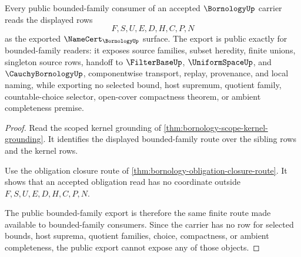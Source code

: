 \begin{theorem}
\label{thm:bornology-public-bounded-family-export}
Every public bounded-family consumer of an accepted $\BornologyUp$ carrier reads the displayed rows
$$
F,S,U,E,D,H,C,P,N
$$
as the exported $\NameCert_{\BornologyUp}$ surface. The export is public exactly for bounded-family readers: it exposes source families, subset heredity, finite unions, singleton source rows, handoff to $\FilterBaseUp$, $\UniformSpaceUp$, and $\CauchyBornologyUp$, componentwise transport, replay, provenance, and local naming, while exporting no selected bound, host supremum, quotient family, countable-choice selector, open-cover compactness theorem, or ambient completeness premise.
\end{theorem}
\begin{proof}
Read the scoped kernel grounding of \autoref{thm:bornology-scope-kernel-grounding}. It identifies the displayed bounded-family route over the sibling rows and the kernel rows.

Use the obligation closure route of \autoref{thm:bornology-obligation-closure-route}. It shows that an accepted obligation read has no coordinate outside $F,S,U,E,D,H,C,P,N$.

The public bounded-family export is therefore the same finite route made available to bounded-family consumers. Since the carrier has no row for selected bounds, host suprema, quotient families, choice, compactness, or ambient completeness, the public export cannot expose any of those objects.
\end{proof}


\begin{closurestatus}{\BornologyUp}
  \theoryclosure{\publicClosure}
  \formalstatus{\unformalizedV}
\end{closurestatus}
